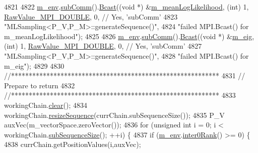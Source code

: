 \begin{DoxyCode}
{{{{4821 
4822   \hyperlink{class_q_u_e_s_o_1_1_m_l_sampling_a13f1ca4fe9f94822fe572a743eaced1d}{m\_env}.\hyperlink{class_q_u_e_s_o_1_1_base_environment_affe39f53e3d5d678842413370af09145}{subComm}().\hyperlink{class_q_u_e_s_o_1_1_mpi_comm_abd6af8db8b0c7fd2f5b62e26477a9537}{Bcast}((\textcolor{keywordtype}{void} *) &\hyperlink{class_q_u_e_s_o_1_1_m_l_sampling_aec4229773274b58e3eaa49a77738389f}{m\_meanLogLikelihood}, (\textcolor{keywordtype}{int}) 1, 
      \hyperlink{_mpi_comm_8h_ad0f503bd9fecfe4e570ca3d15aaf2518}{RawValue\_MPI\_DOUBLE}, 0, \textcolor{comment}{// Yes, 'subComm'}
4823                         \textcolor{stringliteral}{"MLSampling<P\_V,P\_M>::generateSequence()"},
4824                         \textcolor{stringliteral}{"failed MPI.Bcast() for m\_meanLogLikelihood"});
4825 
4826   \hyperlink{class_q_u_e_s_o_1_1_m_l_sampling_a13f1ca4fe9f94822fe572a743eaced1d}{m\_env}.\hyperlink{class_q_u_e_s_o_1_1_base_environment_affe39f53e3d5d678842413370af09145}{subComm}().\hyperlink{class_q_u_e_s_o_1_1_mpi_comm_abd6af8db8b0c7fd2f5b62e26477a9537}{Bcast}((\textcolor{keywordtype}{void} *) &\hyperlink{class_q_u_e_s_o_1_1_m_l_sampling_abec7f8cf9da08bc5c0a20d99fa4570af}{m\_eig}, (\textcolor{keywordtype}{int}) 1, 
      \hyperlink{_mpi_comm_8h_ad0f503bd9fecfe4e570ca3d15aaf2518}{RawValue\_MPI\_DOUBLE}, 0, \textcolor{comment}{// Yes, 'subComm'}
4827                         \textcolor{stringliteral}{"MLSampling<P\_V,P\_M>::generateSequence()"},
4828                         \textcolor{stringliteral}{"failed MPI.Bcast() for m\_eig"});
4829 
4830   \textcolor{comment}{//***********************************************************}
4831   \textcolor{comment}{// Prepare to return}
4832   \textcolor{comment}{//***********************************************************}
4833   workingChain.\hyperlink{class_q_u_e_s_o_1_1_base_vector_sequence_aae0804eacc51b37e84b1bd329ce1711c}{clear}();
4834   workingChain.\hyperlink{class_q_u_e_s_o_1_1_base_vector_sequence_adc238af7f6e8af2402ab791de7d60af5}{resizeSequence}(currChain.subSequenceSize());
4835   P\_V auxVec(m\_vectorSpace.zeroVector());
4836   \textcolor{keywordflow}{for} (\textcolor{keywordtype}{unsigned} \textcolor{keywordtype}{int} i = 0; i < workingChain.\hyperlink{class_q_u_e_s_o_1_1_base_vector_sequence_afd6278702d40bdf1044697bbd6ad1957}{subSequenceSize}(); ++i) \{
4837     \textcolor{keywordflow}{if} (\hyperlink{class_q_u_e_s_o_1_1_m_l_sampling_a13f1ca4fe9f94822fe572a743eaced1d}{m\_env}.\hyperlink{class_q_u_e_s_o_1_1_base_environment_ae106b5bb8a80b655b88b3a26b1e7c185}{inter0Rank}() >= 0) \{
4838       currChain.getPositionValues(i,auxVec);
}}}}
\end{DoxyCode}
